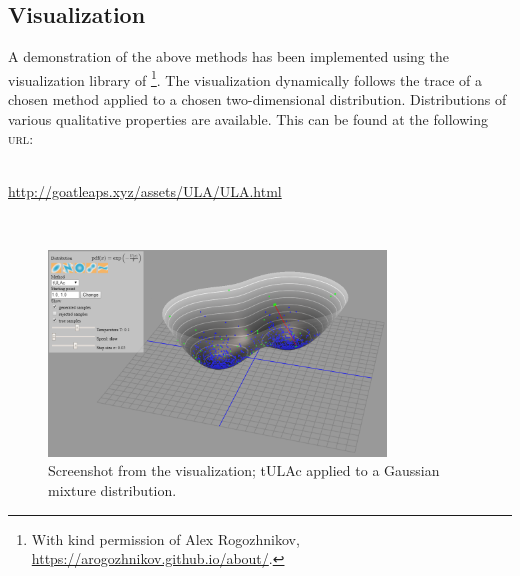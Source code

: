 \subsection{Visualization}
A demonstration of the above methods has been implemented using the visualization library of \cite{rogozhnikov2016hmc}\footnote{With kind permission of Alex Rogozhnikov, \url{https://arogozhnikov.github.io/about/}.}. The visualization dynamically follows the trace of a chosen method applied to a chosen two-dimensional distribution. Distributions of various qualitative properties are available. This can be found at the following \textsc{url}: \\
\\
   \centerline{ \url{http://goatleaps.xyz/assets/ULA/ULA.html}}
\\
\begin{figure}[H]
\centering
  \begin{minipage}[b]{0.8\textwidth}
  \centering
    \includegraphics[width=0.8\textwidth]{Figures/ulavis.PNG}
    \caption{Screenshot from the visualization;  tULAc applied to a Gaussian mixture distribution.}
  \end{minipage}
\end{figure}

